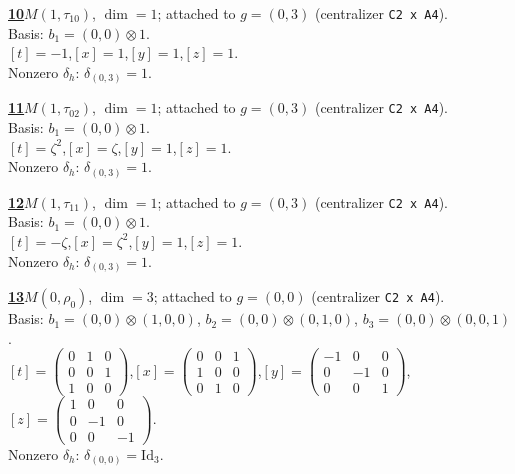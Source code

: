 \begin{samepage}\noindent\textbf{\underline{10}}\quad $M(1,\tau_{10})$, $\dim=1$; attached to $g=(0,3)$ (centralizer \texttt{C2 x A4}).\\
Basis: $b_{1}=(0,0)\otimes 1$.\\
$[t]=-1$,\quad $[x]=1$,\quad $[y]=1$,\quad $[z]=1$.\\
Nonzero $\delta_h$: $\delta_{(0,3)}=1$.\end{samepage}
\medskip

\begin{samepage}\noindent\textbf{\underline{11}}\quad $M(1,\tau_{02})$, $\dim=1$; attached to $g=(0,3)$ (centralizer \texttt{C2 x A4}).\\
Basis: $b_{1}=(0,0)\otimes 1$.\\
$[t]=\zeta^2$,\quad $[x]=\zeta$,\quad $[y]=1$,\quad $[z]=1$.\\
Nonzero $\delta_h$: $\delta_{(0,3)}=1$.\end{samepage}
\medskip

\begin{samepage}\noindent\textbf{\underline{12}}\quad $M(1,\tau_{11})$, $\dim=1$; attached to $g=(0,3)$ (centralizer \texttt{C2 x A4}).\\
Basis: $b_{1}=(0,0)\otimes 1$.\\
$[t]=-\zeta$,\quad $[x]=\zeta^2$,\quad $[y]=1$,\quad $[z]=1$.\\
Nonzero $\delta_h$: $\delta_{(0,3)}=1$.\end{samepage}
\medskip

\begin{samepage}\noindent\textbf{\underline{13}}\quad $M(0,\rho_{0})$, $\dim=3$; attached to $g=(0,0)$ (centralizer \texttt{C2 x A4}).\\
Basis: $b_{1}=(0,0)\otimes (1,0,0)$, $b_{2}=(0,0)\otimes (0,1,0)$, $b_{3}=(0,0)\otimes (0,0,1)$.\\
$[t]=\left(\begin{smallmatrix} 0 & 1 & 0 \\ 0 & 0 & 1 \\ 1 & 0 & 0 \end{smallmatrix}\right)$,\quad $[x]=\left(\begin{smallmatrix} 0 & 0 & 1 \\ 1 & 0 & 0 \\ 0 & 1 & 0 \end{smallmatrix}\right)$,\quad $[y]=\left(\begin{smallmatrix} -1 & 0 & 0 \\ 0 & -1 & 0 \\ 0 & 0 & 1 \end{smallmatrix}\right)$,\quad $[z]=\left(\begin{smallmatrix} 1 & 0 & 0 \\ 0 & -1 & 0 \\ 0 & 0 & -1 \end{smallmatrix}\right)$.\\
Nonzero $\delta_h$: $\delta_{(0,0)}=\mathrm{Id}_{3}$.\end{samepage}
\medskip

